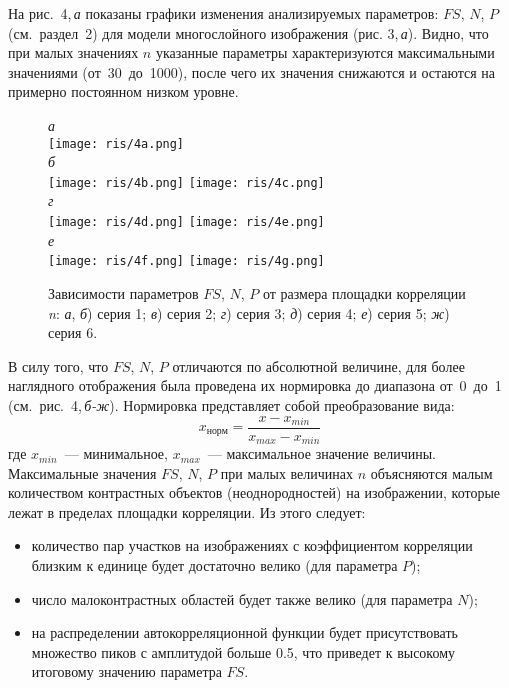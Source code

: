 \documentclass[a4paper]{jctart10}
\begin{document}
На рис.~4,\,{\it а} показаны графики изменения анализируемых параметров: $FS$, $N$, $P$ (см.~раздел~2) для модели многослойного изображения (рис. 3,\,{\it а}). Видно, что при малых значениях $n$ указанные параметры характеризуются максимальными значениями (от~30~до~1000), после чего их значения снижаются и остаются на примерно постоянном низком уровне.
\begin{figure}[htbp]
    \centering
		\small{\it а}\\
    \texttt{[image: ris/4a.png]}\\
		{\it б}\hspace*{75mm}{\it в}\\[2mm]
		\texttt{[image: ris/4b.png]}\hspace*{15mm}
		\texttt{[image: ris/4c.png]}\\
		{\it г}\hspace*{75mm}{\it д}\\[2mm]
		\texttt{[image: ris/4d.png]}\hspace*{15mm}
		\texttt{[image: ris/4e.png]}\\
		{\it е}\hspace*{75mm}{\it ж}\\[2mm]
		\texttt{[image: ris/4f.png]}\hspace*{15mm}
		\texttt{[image: ris/4g.png]}
    \caption{Зависимости параметров $FS$, $N$, $P$ от размера площадки корреляции {\it n}: {\it а}, {\it б}) серия 1; {\it в}) серия 2; {\it г}) серия 3; {\it д}) серия 4; {\it е}) серия 5; {\it ж}) серия 6.}
\end{figure}

В силу того, что $FS$, $N$, $P$ отличаются по абсолютной величине, для более наглядного отображения была проведена их нормировка до диапазона от~0~до~1 (см.~рис.~4,\,{\it б-ж}). Нормировка представляет собой преобразование вида:
\begin{equation}
x_{норм} = \frac{x-x_{min}}{x_{max}-x_{min}}
\end{equation}
где $x_{min}$~--- минимальное, $x_{max}$~--- максимальное значение величины.
Максимальные значения $FS$, $N$, $P$ при малых величинах $n$ объясняются малым количеством контрастных объектов (неоднородностей) на изображении, которые лежат в пределах площадки корреляции. Из этого следует:
\begin{itemize}
	\item количество пар участков на изображениях с коэффициентом корреляции близким к единице будет достаточно велико (для параметра $P$);
	\item число малоконтрастных областей будет также велико (для параметра $N$);
	\item на распределении автокорреляционной функции будет присутствовать множество пиков с амплитудой больше 0.5, что приведет к высокому итоговому значению параметра $FS$.
\end{itemize}
\end{document}
